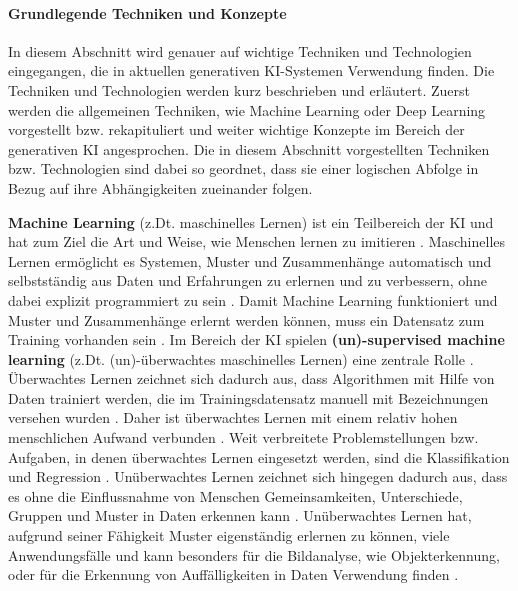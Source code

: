 \paragraph{Grundlegende Techniken und Konzepte}
\label{sec2:sota:par:basic-concepts}
In diesem Abschnitt wird genauer auf wichtige Techniken und Technologien eingegangen, die in aktuellen generativen KI-Systemen Verwendung finden.
Die Techniken und Technologien werden kurz beschrieben und erläutert.
Zuerst werden die allgemeinen Techniken, wie Machine Learning oder Deep Learning vorgestellt bzw. rekapituliert und weiter wichtige Konzepte im Bereich der generativen KI angesprochen.
Die in diesem Abschnitt vorgestellten Techniken bzw. Technologien sind dabei so geordnet, dass sie einer logischen Abfolge in Bezug auf ihre Abhängigkeiten zueinander folgen.

\textbf{Machine Learning} (z.Dt. maschinelles Lernen) ist ein Teilbereich der KI \cite{machine-learning-big-data-insider} und hat zum Ziel die Art und Weise, wie Menschen lernen zu imitieren \cite{ai-ml-dl}.
Maschinelles Lernen ermöglicht es Systemen, Muster und Zusammenhänge automatisch und selbstständig aus Daten und Erfahrungen zu erlernen und zu verbessern, ohne dabei explizit programmiert zu sein \cite{machine-learning-data-absolut}.
Damit Machine Learning funktioniert und Muster und Zusammenhänge erlernt werden können, muss ein Datensatz zum Training vorhanden sein \cite{machine-learning-data-absolut}.
Im Bereich der KI spielen \textbf{(un)-supervised machine learning} (z.Dt. (un)-überwachtes maschinelles Lernen) eine zentrale Rolle \cite{machine-learning-big-data-insider}.
Überwachtes Lernen zeichnet sich dadurch aus, dass Algorithmen mit Hilfe von Daten trainiert werden, die im Trainingsdatensatz manuell mit Bezeichnungen versehen wurden \cite{machine-learning-data-absolut}.
Daher ist überwachtes Lernen mit einem relativ hohen menschlichen Aufwand verbunden \cite{machine-learning-data-absolut}.
Weit verbreitete Problemstellungen bzw. Aufgaben, in denen überwachtes Lernen eingesetzt werden, sind die Klassifikation und Regression \cite{machine-learning-algorithms-quick-review}.
Unüberwachtes Lernen zeichnet sich hingegen dadurch aus, dass es ohne die Einflussnahme von Menschen Gemeinsamkeiten, Unterschiede, Gruppen und Muster in Daten erkennen kann \cite{machine-learning-data-absolut}.
Unüberwachtes Lernen hat, aufgrund seiner Fähigkeit Muster eigenständig erlernen zu können, viele Anwendungsfälle und kann besonders für die Bildanalyse, wie Objekterkennung, oder für die Erkennung von Auffälligkeiten in Daten Verwendung finden \cite{machine-learning-ibm}.

